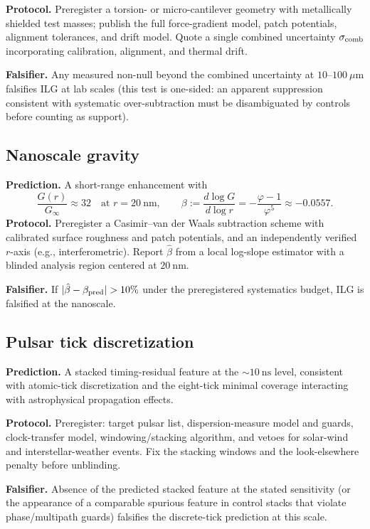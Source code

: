 \documentclass[11pt]{article}
\begin{document}
\textbf{Protocol.} Preregister a torsion- or micro-cantilever geometry with metallically shielded test masses; publish the full force-gradient model, patch potentials, alignment tolerances, and drift model. Quote a single combined uncertainty \(\sigma_{\rm comb}\) incorporating calibration, alignment, and thermal drift.

\textbf{Falsifier.} Any measured non-null beyond the combined uncertainty at \(10\text{--}100~\mu\mathrm{m}\) falsifies ILG at lab scales (this test is one-sided: an apparent suppression consistent with systematic over-subtraction must be disambiguated by controls before counting as support).

\subsection{Nanoscale gravity}\label{subsec:pred-nano}
\textbf{Prediction.} A short-range enhancement with%
\[
\frac{G(r)}{G_\infty}\approx 32\quad\text{at } r=20~\mathrm{nm},\qquad
\beta:=\frac{d\log G}{d\log r}=-\frac{\varphi-1}{\varphi^5}\approx -0.0557.
\]
\textbf{Protocol.} Preregister a Casimir–van der Waals subtraction scheme with calibrated surface roughness and patch potentials, and an independently verified \(r\)-axis (e.g., interferometric). Report \(\hat\beta\) from a local log-slope estimator with a blinded analysis region centered at \(20~\mathrm{nm}\).

\textbf{Falsifier.} If \(|\hat\beta-\beta_{\rm pred}|>10\%\) under the preregistered systematics budget, ILG is falsified at the nanoscale.%

\subsection{Pulsar tick discretization}\label{subsec:pred-pulsars}
\textbf{Prediction.} A stacked timing-residual feature at the \(\sim 10~\mathrm{ns}\) level, consistent with atomic-tick discretization and the eight-tick minimal coverage interacting with astrophysical propagation effects.

\textbf{Protocol.} Preregister: target pulsar list, dispersion-measure model and guards, clock-transfer model, windowing/stacking algorithm, and vetoes for solar-wind and interstellar-weather events. Fix the stacking windows and the look-elsewhere penalty before unblinding.%

\textbf{Falsifier.} Absence of the predicted stacked feature at the stated sensitivity (or the appearance of a comparable spurious feature in control stacks that violate phase/multipath guards) falsifies the discrete-tick prediction at this scale.
\end{document}
